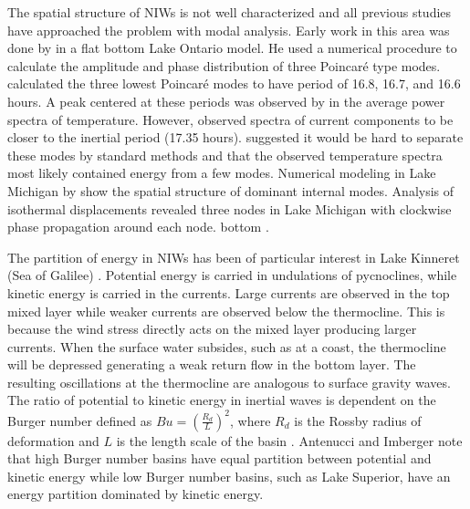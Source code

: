 \begin{comment}
\citet{austin_2013} also makes the point that the strength of the stratification is not predictive of the amplitude of inertial oscillations and suggests the wind field plays a more important role.  
\end{comment}


The spatial structure of NIWs is not well characterized and all previous studies have approached the problem with modal analysis. 
Early work in this area was done by \citet{schwab_1977} in a flat bottom Lake Ontario model. He used a numerical procedure to calculate the amplitude and phase distribution of three  
Poincar\'{e} type modes. \citet{schwab_1977} calculated the three lowest Poincar\'{e} modes to have period of 16.8, 16.7, and 16.6 hours. A peak centered at these periods was observed 
by \citet{pickett_1975} in the average power spectra of temperature. However,  \citet{pickett_1975} observed spectra of current components to be closer to the inertial period (17.35 hours). 
\citet{schwab_1977} suggested it would be hard to separate these modes by standard methods and that the observed temperature spectra most likely contained energy from a few modes.
 Numerical modeling in Lake Michigan by  \citet{ahmed2013spatial} show the spatial structure of dominant internal modes. 
Analysis of isothermal displacements revealed three nodes in Lake Michigan with clockwise phase propagation around each node. 
bottom \citep{gomez_2006}. 

The partition of energy in NIWs has been of particular interest in Lake Kinneret (Sea of Galilee)  \citep{antenucci2001energetics}.  Potential energy is
carried in undulations of pycnoclines, while kinetic energy is carried in the currents. Large currents are observed in the top mixed layer while weaker currents are
observed below the thermocline.  This is because the wind stress directly acts on the mixed layer producing larger currents. 
When the surface water subsides, such as at a coast, the thermocline will be depressed
generating a weak return flow in the bottom layer. The resulting oscillations at the thermocline are analogous to surface gravity waves. The ratio of potential
to kinetic energy in inertial waves is dependent on the Burger number defined as $Bu=(\frac{R_d}{L})^2$, where $R_d$ is the Rossby radius of deformation and $L$ is the
length scale of the basin \citep{antenucci2001energetics}. Antenucci and Imberger note that high Burger number basins have equal partition between potential and kinetic energy while 
low Burger number basins, such as Lake Superior, have an energy partition dominated by kinetic energy. 

